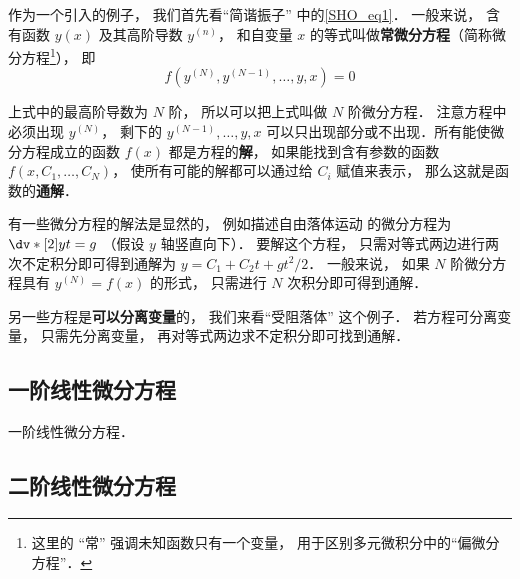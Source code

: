 
\begin{issues}
\issueDraft
\end{issues}


作为一个引入的例子， 我们首先看“简谐振子” 中的\autoref{SHO_eq1}． 一般来说， 含有函数 $y(x)$ 及其高阶导数 $y^{(n)}$， 和自变量 $x$ 的等式叫做\textbf{常微分方程}（简称微分方程\footnote{这里的 “常” 强调未知函数只有一个变量， 用于区别多元微积分中的“偏微分方程”．}）， 即
\begin{equation}
f(y^{(N)}, y^{(N-1)}, \dots, y, x) = 0
\end{equation}

上式中的最高阶导数为 $N$ 阶， 所以可以把上式叫做 $N$ 阶微分方程． 注意方程中必须出现 $y^{(N)}$， 剩下的 $y^{(N-1)}, \dots, y, x$ 可以只出现部分或不出现．所有能使微分方程成立的函数 $f(x)$ 都是方程的\textbf{解}， 如果能找到含有参数的函数 $f(x,C_1, \dots , C_N)$， 使所有可能的解都可以通过给 $C_i$ 赋值来表示， 那么这就是函数的\textbf{通解}．

有一些微分方程的解法是显然的， 例如描述自由落体运动 的微分方程为 $\dv*[2]{y}{t} = g$ （假设 $y$ 轴竖直向下）． 要解这个方程， 只需对等式两边进行两次不定积分即可得到通解为 $y = C_1 + C_2 t + gt^2/2$． 一般来说， 如果 $N$ 阶微分方程具有 $y^{(N)} = f(x)$ 的形式， 只需进行 $N$ 次积分即可得到通解．

另一些方程是\textbf{可以分离变量}的， 我们来看“受阻落体” 这个例子． 若方程可分离变量， 只需先分离变量， 再对等式两边求不定积分即可找到通解．



\subsection{一阶线性微分方程}
一阶线性微分方程．

\subsection{二阶线性微分方程}